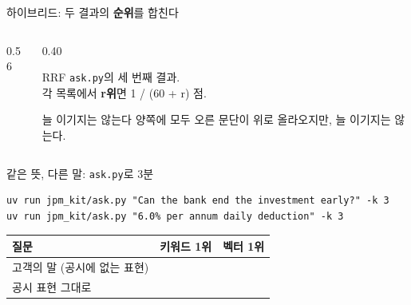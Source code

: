 \begin{frame}{ 하이브리드: 두 결과의 \textbf{순위}를 합친다}
\begin{columns}[c]
\begin{column}{0.56\textwidth}
\centering
{}
\end{column}
\begin{column}{0.40\textwidth}
\begin{block}{RRF}
\small \texttt{ask.py}의 세 번째 결과.\\[2pt]
각 목록에서 \textbf{r위}면 \num{1 / (60 + r)} 점.
\end{block}
\begin{alertblock}{늘 이기지는 않는다}
\small 양쪽에 모두 오른 문단이 위로 올라오지만, 늘 이기지는 않는다.
\end{alertblock}
\end{column}
\end{columns}
\end{frame}

\begin{frame}[fragile]{ 같은 뜻, 다른 말: \texttt{ask.py}로 3분}
\begin{Verbatim}
uv run jpm_kit/ask.py "Can the bank end the investment early?" -k 3
uv run jpm_kit/ask.py "6.0% per annum daily deduction" -k 3
\end{Verbatim}
\vspace{0.6em}
\begin{tabularx}{\textwidth}{@{}l X X@{}}
\toprule
\textbf{질문} & \textbf{키워드 1위} & \textbf{벡터 1위} \\
\midrule
고객의 말 (공시에 없는 표현) & & \\[8pt]
공시 표현 그대로 & & \\[8pt]
\bottomrule
\end{tabularx}
\end{frame}

